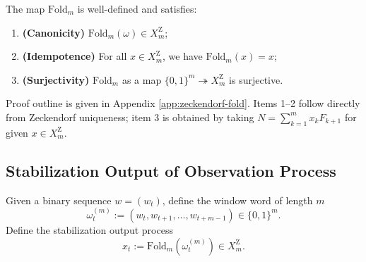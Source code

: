 \begin{theorem}\label{thm:fold-properties}
The map $\mathrm{Fold}_m$ is well-defined and satisfies:
\begin{enumerate}
  \item \textbf{(Canonicity)} $\mathrm{Fold}_m(\omega)\in X_m^{\mathrm Z}$;
  \item \textbf{(Idempotence)} For all $x\in X_m^{\mathrm Z}$, we have $\mathrm{Fold}_m(x)=x$;
  \item \textbf{(Surjectivity)} $\mathrm{Fold}_m$ as a map $\{0,1\}^m\twoheadrightarrow X_m^{\mathrm Z}$ is surjective.
\end{enumerate}
\end{theorem}

\begin{remark}
Proof outline is given in Appendix \ref{app:zeckendorf-fold}. Items 1--2 follow directly from Zeckendorf uniqueness; item 3 is obtained by taking $N=\sum_{k=1}^m x_k F_{k+1}$ for given $x\in X_m^{\mathrm Z}$.
\end{remark}

\subsection{Stabilization Output of Observation Process}

\begin{definition}\label{def:sliding-fold}
Given a binary sequence $w=(w_t)$, define the window word of length $m$
\[
\omega_t^{(m)}:=(w_t,w_{t+1},\dots,w_{t+m-1})\in\{0,1\}^m.
\]
Define the stabilization output process
\[
x_t:=\mathrm{Fold}_m(\omega_t^{(m)})\in X_m^{\mathrm Z}.
\]
\end{definition}
